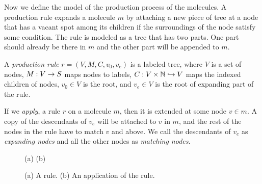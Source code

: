 Now we define the model of the production process of the molecules.
A production rule expands a molecule $m$ by attaching a new piece of tree at a node that has a vacant spot among its children if the surroundings of the
node satisfy some condition.
The rule is modeled as a tree that has two parts.
One part should already be there in $m$ and the other part will be appended to $m$.

\begin{df}
  A {\em production rule} $r = (V, M, C, v_0, v_e)$ is a labeled tree, where
  $V$ is a set of nodes,
  $M : V \rightarrow S$ maps nodes to labels, 
  $C : V \times \mathbb{N} \hookrightarrow V$ maps the indexed children of nodes,
  $v_0 \in V$ is the root, and
  $v_e \in V$ is the root of expanding part of the rule.
\end{df}

If we {\em apply}, a rule $r$ on a molecule $m$, then it is extended at some node
$v \in m$. A copy of the descendants of $v_e$ will be attached to
$v$ in $m$, and the rest of the nodes in the rule have to match $v$ and above.
We call the descendants of $v_e$ as {\em expanding nodes}
and all the other nodes as {\em matching nodes}.


\begin{wrapfigure}{r}{0.37\textwidth}
  \vspace{-12mm}
      \small
  \quad
  \hfill (a) \hfill (b)\hfill\mbox{}
  \caption{(a) A rule. (b) An application of the rule.}
  \label{fig:exrule}
  \vspace{-8mm}
\end{wrapfigure}
